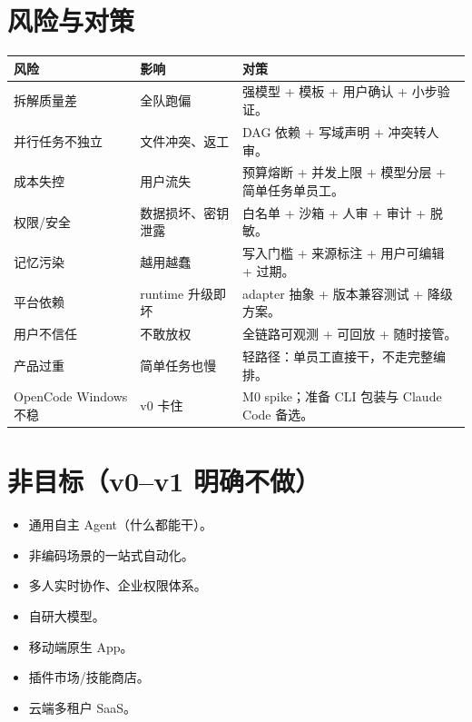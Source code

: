 \documentclass[UTF8,11pt,a4paper,fontset=windows]{ctexart}
\let\ocsection\section
\renewcommand{\section}{\Needspace{8\baselineskip}\ocsection}
\begin{document}
\section{风险与对策}

\noindent\begin{minipage}{\linewidth}
\centering
{}
\small
\begin{tabularx}{\linewidth}{@{}p{3.4cm} p{4.4cm} X@{}}
\toprule
\textbf{风险} & \textbf{影响} & \textbf{对策} \\
\midrule
拆解质量差 & 全队跑偏 & 强模型 + 模板 + 用户确认 + 小步验证。 \\
并行任务不独立 & 文件冲突、返工 & DAG 依赖 + 写域声明 + 冲突转人审。 \\
成本失控 & 用户流失 & 预算熔断 + 并发上限 + 模型分层 + 简单任务单员工。 \\
权限/安全 & 数据损坏、密钥泄露 & 白名单 + 沙箱 + 人审 + 审计 + 脱敏。 \\
记忆污染 & 越用越蠢 & 写入门槛 + 来源标注 + 用户可编辑 + 过期。 \\
平台依赖 & runtime 升级即坏 & adapter 抽象 + 版本兼容测试 + 降级方案。 \\
用户不信任 & 不敢放权 & 全链路可观测 + 可回放 + 随时接管。 \\
产品过重 & 简单任务也慢 & 轻路径：单员工直接干，不走完整编排。 \\
OpenCode Windows 不稳 & v0 卡住 & M0 spike；准备 CLI 包装与 Claude Code 备选。 \\
\bottomrule
\end{tabularx}
\end{minipage}

\section{非目标（v0--v1 明确不做）}

\begin{itemize}
  \item 通用自主 Agent（什么都能干）。
  \item 非编码场景的一站式自动化。
  \item 多人实时协作、企业权限体系。
  \item 自研大模型。
  \item 移动端原生 App。
  \item 插件市场/技能商店。
  \item 云端多租户 SaaS。
\end{itemize}
\end{document}
